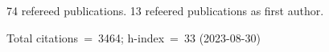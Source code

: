 74 refereed publications. 13 refeered publications as first author.

Total citations~=~3464; h-index~=~33 (2023-08-30)